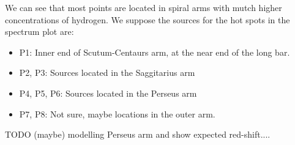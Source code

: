We can see that most points are located in spiral arms with mutch higher concentrations of hydrogen. We suppose the sources for the hot spots in the spectrum plot are:
\begin{itemize}
	\item P1: Inner end of Scutum-Centaurs arm, at the near end of the long bar.
	\item P2, P3: Sources located in the Saggitarius arm
	\item P4, P5, P6: Sources located in the Perseus arm
	\item P7, P8: Not sure, maybe locations in the outer arm.
\end{itemize}

TODO (maybe) modelling Perseus arm and show expected red-shift....